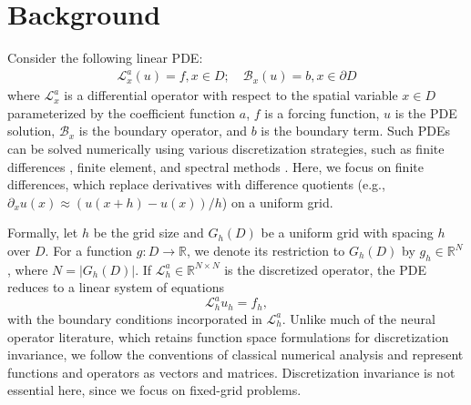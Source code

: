 \documentclass{article}
\begin{document}
\section{Background} \label{sec:background}



Consider the following linear PDE:
\begin{equation} \label{eq:mainpde}
    \begin{split}
    \mathcal{L}_{x}^a\left(u\right) = f ,x \in D; \quad
    \mathcal{B}_{x}\left(u\right) = b ,x \in \partial D
    \end{split}
\end{equation}
where $\mathcal{L}_x^a$ is a differential operator with respect to the spatial variable $x \in D$ parameterized by the coefficient function $a$,  $f$ is a forcing function,  $u$ is the PDE solution, $\mathcal{B}_{x}$ is the boundary operator, and $b$ is the boundary term. Such PDEs can be solved numerically using various discretization strategies, such as finite differences \citep{smith1985numerical,leveque2007finite}, finite element, and spectral methods \citep{boyd2001chebyshev,canuto2006spectral}. Here, we focus on finite differences, which replace derivatives with difference quotients (e.g., $\partial_x u(x) \approx (u(x + h) - u(x))/h$) on a uniform grid.

Formally, let $h$ be the grid size and $G_h(D)$ be a uniform grid with spacing $h$ over $D$. For a function $g: D \to \mathbb{R}$, we denote its restriction to $G_h(D)$ by $g_h \in \mathbb{R}^N$,
where $N = |G_h(D)|$. If $\mathcal{L}_h^a \in \mathbb{R}^{N \times N}$ is the discretized operator, the PDE reduces to a linear system of equations
\begin{equation} \label{eq:mainpdediscrete}
    \mathcal{L}_h^au_h = f_h,
\end{equation}
with the boundary conditions incorporated in $\mathcal{L}_h^a$. Unlike much of the neural operator literature, which retains function space formulations for discretization invariance, we follow the conventions of classical numerical analysis and represent functions and operators as vectors and matrices. Discretization invariance is not essential here, since we focus on fixed-grid problems.
\end{document}
